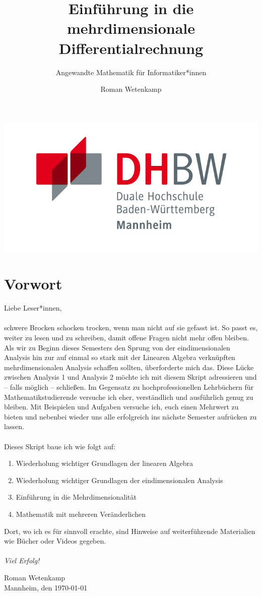 \documentclass[11pt,a4paper]{scrartcl}
\author{Roman Wetenkamp}
\title{Einführung in die mehrdimensionale Differentialrechnung}
\subtitle{Angewandte Mathematik für Informatiker*innen}
\theoremstyle{remark}
\theoremstyle{definition}
\begin{document}
\vspace{3cm}
\maketitle
\begin{center}
\includegraphics[scale=0.7]{DHBW.jpg}
\end{center}
\pagebreak
\tableofcontents
\pagebreak
\section*{Vorwort}
Liebe Leser*innen, \\\\
schwere Brocken schocken trocken, wenn man nicht auf sie gefasst ist. So passt es, weiter zu lesen und zu schreiben, damit offene Fragen nicht mehr offen bleiben. Als wir zu Beginn dieses Semesters den Sprung von der eindimensionalen Analysis hin zur auf einmal so stark mit der Linearen Algebra verknüpften mehrdimensionalen Analysis schaffen sollten, überforderte mich das. Diese Lücke zwischen Analysis 1 und Analysis 2 möchte ich mit diesem Skript adressieren und -- falls möglich -- schließen. Im Gegensatz zu hochprofessionellen Lehrbüchern für Mathematikstudierende versuche ich eher, verständlich und ausführlich genug zu bleiben. Mit Beispielen und Aufgaben versuche ich, euch einen Mehrwert zu bieten und nebenbei wieder uns alle erfolgreich ins nächste Semester aufrücken zu lassen. \\\\
Dieses Skript baue ich wie folgt auf:
\begin{enumerate}
\item Wiederholung wichtiger Grundlagen der linearen Algebra
\item Wiederholung wichtiger Grundlagen der eindimensionalen Analysis
\item Einführung in die Mehrdimensionalität
\item Mathematik mit mehreren Veränderlichen
\end{enumerate}
Dort, wo ich es für sinnvoll erachte, sind Hinweise auf weiterführende Materialien wie Bücher oder Videos gegeben. \\\\
\textit{Viel Erfolg!}  \\
\begin{flushright}
Roman Wetenkamp \\
Mannheim, den \today
\end{flushright}  
\vfill
\end{document}
